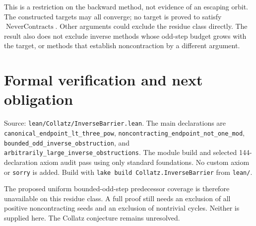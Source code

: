 \documentclass[10pt]{article}
\begin{document}
This is a restriction on the backward method, not evidence of an escaping
orbit. The constructed targets may all converge; no target is proved to
satisfy $\operatorname{NeverContracts}$. Other arguments could exclude the
residue class directly. The result also does not exclude inverse methods
whose odd-step budget grows with the target, or methods that establish
noncontraction by a different argument.

\section{Formal verification and next obligation}
{\raggedright
Source: \texttt{lean/Collatz/InverseBarrier.lean}. The main declarations are
\texttt{canonical\_endpoint\_lt\_three\_pow},
\texttt{noncontracting\_endpoint\_not\_one\_mod},
\texttt{bounded\_odd\_inverse\_obstruction}, and
\texttt{arbitrarily\_large\_inverse\_obstructions}.
The module build and selected 144-declaration axiom audit pass using only
standard foundations. No custom axiom or \texttt{sorry} is added.
Build with \texttt{lake build Collatz.InverseBarrier} from \texttt{lean/}.\par}

The proposed uniform bounded-odd-step predecessor coverage is therefore
unavailable on this residue class. A full proof still needs an exclusion
of all positive noncontracting seeds and an exclusion of nontrivial cycles.
Neither is supplied here. The Collatz conjecture remains unresolved.
\end{document}

